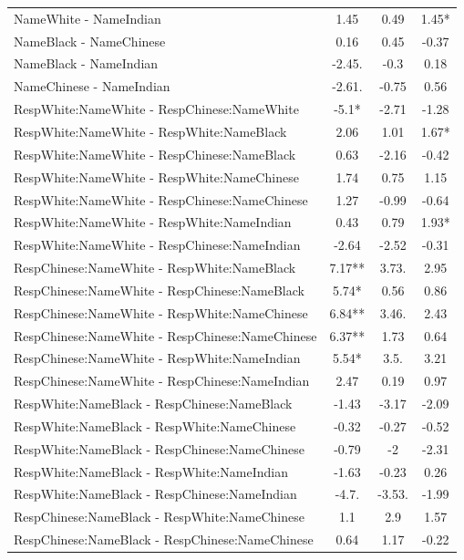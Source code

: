 \documentclass[]{report}
\begin{document}
\begin{table}
{\begin{tabular}[t]{lccc}
		NameWhite - NameIndian & 1.45 & 0.49 & 1.45* \\ 
		NameBlack - NameChinese & 0.16 & 0.45 & -0.37 \\ 
		NameBlack - NameIndian & -2.45. & -0.3 & 0.18 \\ 
		NameChinese - NameIndian & -2.61. & -0.75 & 0.56 \\ 
		RespWhite:NameWhite - RespChinese:NameWhite & -5.1* & -2.71 & -1.28 \\ 
		RespWhite:NameWhite - RespWhite:NameBlack & 2.06 & 1.01 & 1.67* \\ 
		RespWhite:NameWhite - RespChinese:NameBlack & 0.63 & -2.16 & -0.42 \\ 
		RespWhite:NameWhite - RespWhite:NameChinese & 1.74 & 0.75 & 1.15 \\ 
		RespWhite:NameWhite - RespChinese:NameChinese & 1.27 & -0.99 & -0.64 \\ 
		RespWhite:NameWhite - RespWhite:NameIndian & 0.43 & 0.79 & 1.93* \\ 
		RespWhite:NameWhite - RespChinese:NameIndian & -2.64 & -2.52 & -0.31 \\ 
		RespChinese:NameWhite - RespWhite:NameBlack & 7.17** & 3.73. & 2.95 \\ 
		RespChinese:NameWhite - RespChinese:NameBlack & 5.74* & 0.56 & 0.86 \\ 
		RespChinese:NameWhite - RespWhite:NameChinese & 6.84** & 3.46. & 2.43 \\ 
		RespChinese:NameWhite - RespChinese:NameChinese & 6.37** & 1.73 & 0.64 \\ 
		RespChinese:NameWhite - RespWhite:NameIndian & 5.54* & 3.5. & 3.21 \\ 
		RespChinese:NameWhite - RespChinese:NameIndian & 2.47 & 0.19 & 0.97 \\ 
		RespWhite:NameBlack - RespChinese:NameBlack & -1.43 & -3.17 & -2.09 \\ 
		RespWhite:NameBlack - RespWhite:NameChinese & -0.32 & -0.27 & -0.52 \\ 
		RespWhite:NameBlack - RespChinese:NameChinese & -0.79 & -2 & -2.31 \\ 
		RespWhite:NameBlack - RespWhite:NameIndian & -1.63 & -0.23 & 0.26 \\ 
		RespWhite:NameBlack - RespChinese:NameIndian & -4.7. & -3.53. & -1.99 \\ 
		RespChinese:NameBlack - RespWhite:NameChinese & 1.1 & 2.9 & 1.57 \\ 
		RespChinese:NameBlack - RespChinese:NameChinese & 0.64 & 1.17 & -0.22 \\ 

\end{tabular}}
\end{table}
\end{document}
